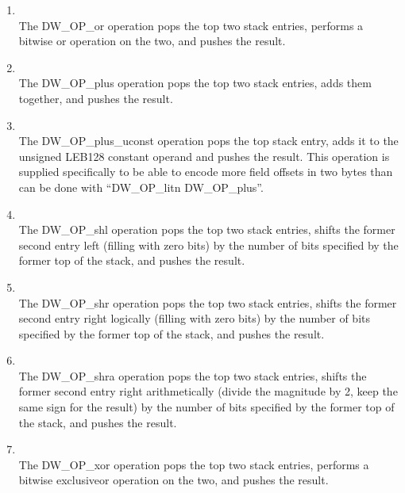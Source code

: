 \begin{enumerate}[1]
\item  {} \\
The DW\-\_OP\-\_or operation pops the top two stack entries, performs
a bitwise or operation on the two, and pushes the result.

\item  {} \\
The DW\-\_OP\-\_plus operation pops the top two stack entries,
adds them together, and pushes the result.

\item  {} \\
The DW\-\_OP\-\_plus\-\_uconst operation pops the top stack entry,
adds it to the unsigned LEB128 constant operand and pushes
the result.  This operation is supplied specifically to be
able to encode more field offsets in two bytes than can be
done with “DW\-\_OP\-\_litn DW\-\_OP\-\_plus”.

\item {} \\
The DW\-\_OP\-\_shl operation pops the top two stack entries,
shifts the former second entry left (filling with zero bits)
by the number of bits specified by the former top of the stack,
and pushes the result.

\item {} \\
The DW\-\_OP\-\_shr operation pops the top two stack entries,
shifts the former second entry right logically (filling with
zero bits) by the number of bits specified by the former top
of the stack, and pushes the result.

\item {} \\
The DW\-\_OP\-\_shra operation pops the top two stack entries,
shifts the former second entry right arithmetically (divide
the magnitude by 2, keep the same sign for the result) by
the number of bits specified by the former top of the stack,
and pushes the result.

\item {} \\
The DW\-\_OP\-\_xor operation pops the top two stack entries,
performs a bitwise exclusive\dash or operation on the two, and
pushes the result.

\end{enumerate}

